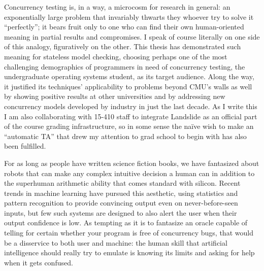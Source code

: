 \documentclass[12pt]{cmuthesis}
\begin{document}
Concurrency testing is, in a way, a microcosm for research in general:
an exponentially large problem
that invariably thwarts they whoever try to solve it ``perfectly'';
it bears fruit only to one who can find their own human-oriented meaning in partial results and compromises.
I speak of course literally on one side of this analogy, figuratively on the other.
This thesis has demonstrated such meaning for stateless model checking,
choosing perhaps one of the most challenging demographics of programmers in need of concurrency testing,
the undergraduate operating systems student,
as its target audience.
Along the way, it justified its techniques' applicability to problems beyond CMU's walls as well
by showing positive results at other universities
and by addressing new concurrency models developed by industry in just the last decade.
As I write this I am also collaborating with 15-410 staff
to integrate Landslide as an official part of the course grading infrastructure,
so in some sense the na\"{i}ve wish to make an ``automatic TA'' that drew my attention to grad school to begin with
has also been fulfilled.

For as long as people have written science fiction books,
we have fantasized about robots that can make any complex intuitive decision a human can
in addition to the superhuman arithmetic ability that comes standard with silicon.
Recent trends in machine learning have pursued this aesthetic,
using statistics and pattern recognition to provide convincing output even on never-before-seen inputs,
but few such systems are designed to also alert the user when their output confidence is low.
As tempting as it is to fantasize an oracle capable of telling for certain whether your program is free of concurrency bugs,
that would be a disservice to both user and machine:
the human skill that artificial intelligence should really try to emulate is
knowing its limits and asking for help when it gets confused.
\end{document}
